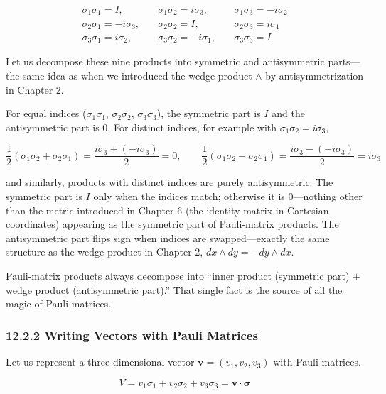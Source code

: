 \documentclass[a4paper,12pt,openany]{book}
\begin{document}
\[
\begin{aligned}
\sigma_1\sigma_1 = I,\quad &\sigma_1\sigma_2 = i\sigma_3,\quad &\sigma_1\sigma_3 = -i\sigma_2 \\
\sigma_2\sigma_1 = -i\sigma_3,\quad &\sigma_2\sigma_2 = I,\quad &\sigma_2\sigma_3 = i\sigma_1 \\
\sigma_3\sigma_1 = i\sigma_2,\quad &\sigma_3\sigma_2 = -i\sigma_1,\quad &\sigma_3\sigma_3 = I
\end{aligned}
\]

Let us decompose these nine products into symmetric and antisymmetric
parts—the same idea as when we introduced the wedge product \(\wedge\)
by antisymmetrization in Chapter 2.

For equal indices (\(\sigma_1\sigma_1\), \(\sigma_2\sigma_2\),
\(\sigma_3\sigma_3\)), the symmetric part is \(I\) and the antisymmetric
part is \(0\). For distinct indices, for example with
\(\sigma_1\sigma_2 = i\sigma_3\),

\[
\frac{1}{2}(\sigma_1\sigma_2 + \sigma_2\sigma_1) = \frac{i\sigma_3 + (-i\sigma_3)}{2} = 0,\qquad
\frac{1}{2}(\sigma_1\sigma_2 - \sigma_2\sigma_1) = \frac{i\sigma_3 - (-i\sigma_3)}{2} = i\sigma_3
\]

and similarly, products with distinct indices are purely antisymmetric.
The symmetric part is \(I\) only when the indices match; otherwise it is
\(0\)—nothing other than the metric introduced in Chapter 6 (the
identity matrix in Cartesian coordinates) appearing as the symmetric
part of Pauli-matrix products. The antisymmetric part flips sign when
indices are swapped—exactly the same structure as the wedge product in
Chapter 2, \(dx\wedge dy = -dy\wedge dx\).

Pauli-matrix products always decompose into ``inner product (symmetric
part) \(+\) wedge product (antisymmetric part).'' That single fact is
the source of all the magic of Pauli matrices.

\hypertarget{writing-vectors-with-pauli-matrices}{%
\subsubsection{12.2.2 Writing Vectors with Pauli
Matrices}\label{writing-vectors-with-pauli-matrices}}

Let us represent a three-dimensional vector
\(\mathbf{v} = (v_1, v_2, v_3)\) with Pauli matrices.

\[V = v_1\sigma_1 + v_2\sigma_2 + v_3\sigma_3 = \mathbf{v}\!\cdot\!\bm{\sigma}\]
\end{document}
